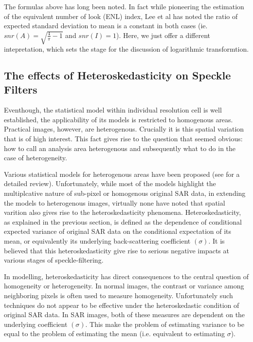 \documentclass[journal]{IEEEtran}
\begin{document}
The formulas above has long been noted. In fact while pioneering the estimation of the equivalent number of look (ENL) index, Lee et al has noted the ratio of expected standard deviation to mean is a constant in both cases (ie. $snr(A)=\sqrt{\frac{4}{\pi}-1}$ and $snr(I)=1$). Here, we just offer a different intepretation, which sets the stage for the discussion of logarithmic transformtion. 

\subsection{ The effects of Heteroskedasticity on Speckle Filters }

Eventhough, the statistical model within individual resolution cell is well established, the applicability of its models is restricted to homogenous areas. 
Practical images, however, are heterogenous. Crucially it is this spatial variation that is of high interest. This fact gives rise to the question that seemed obvious: how to call an analysis area heterogenous and subsequently what to do in the case of heterogeneity.

Various statistical models for heterogenous areas have been proposed (see \cite{Touzi_2002_TGRS} for a detailed review). 
Unfortunately, while most of the models highlight the multiplcative nature of sub-pixel or homogenous original SAR data, in extending the models to heterogenous images, virtually none have noted that spatial varition also gives rise to the heteroskedasticity phenomena. 
Heteroskedasticity, as explained in the previous section, is defined as the dependence of conditional expected variance of original SAR data on the conditional expectation of its mean, or equivalently its underlying back-scattering coefficient $(\sigma)$. 
It is believed that this heteroskedasticity give rise to serious negative impacts at various stages of speckle-filtering. 

In modelling, heteroskedasticity has direct consequences to the central question of homogeneity or heterogeneity. 
In normal images, the contrast or variance among neighboring pixels is often used to measure homogeneity. 
Unfortunately such techniques do not appear to be effective under the heteroskedastic condition of original SAR data. 
In SAR images, both of these measures are dependent on the underlying coefficient $(\sigma)$. 
This make the problem of estimating variance to be equal to the problem of estimating the mean (i.e. equivalent to estimating $\sigma$).
\end{document}
